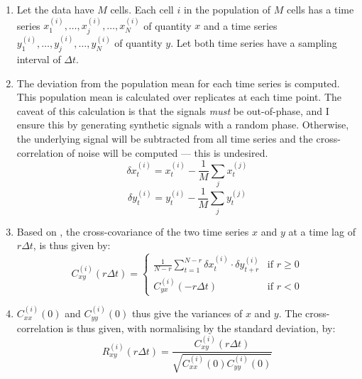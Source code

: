 \begin{enumerate}
  \item Let the data have $M$ cells.
        Each cell $i$ in the population of $M$ cells has a time series $x_{1}^{(i)}, \ldots , x_{j}^{(i)}, \ldots , x_{N}^{(i)}$ of quantity $x$ and a time series $y_{1}^{(i)}, \ldots , y_{j}^{(i)}, \ldots , y_{N}^{(i)}$ of quantity $y$.
        Let both time series have a sampling interval of $\Delta t$.
  \item The deviation from the population mean for each time series is computed.
        This population mean is calculated over replicates at each time point.
        The caveat of this calculation is that the signals \emph{must} be out-of-phase, and I ensure this by generating synthetic signals with a random phase.
        Otherwise, the underlying signal will be subtracted from all time series and the cross-correlation of noise will be computed --- this is undesired.
        \begin{equation}
          \delta x_{t}^{(i)} = x_{t}^{(i)} - \frac{1}{M} \sum_{j}x_{t}^{(j)}
          \label{eq:xcf-dmeans-x}
        \end{equation}
        \begin{equation}
          \delta y_{t}^{(i)} = y_{t}^{(i)} - \frac{1}{M} \sum_{j}y_{t}^{(j)}
          \label{eq:xcf-dmeans-y}
        \end{equation}
  \item Based on \textcite{kivietStochasticityMetabolismGrowth2014}, the cross-covariance of the two time series $x$ and $y$ at a time lag of $r\Delta t$, is thus given by:
        \begin{equation}
          C_{xy}^{(i)}(r\Delta t) =
          \begin{cases}
            \frac{1}{N-r} \sum_{t=1}^{N-r} \delta x_{t}^{(i)} \cdot \delta y_{t+r}^{(i)} & \text{if } r \geq 0 \\
            C_{yx}^{(i)}(-r \Delta t) & \text{if } r < 0
          \end{cases}
          \label{eq:xcf-xcov}
        \end{equation}
    \item $C_{xx}^{(i)}(0)$ and $C_{yy}^{(i)}(0)$ thus give the variances of $x$ and $y$.  The cross-correlation is thus given, with normalising by the standard deviation, by:
        \begin{equation}
          R_{xy}^{(i)}(r \Delta t) = \frac{C_{xy}^{(i)}(r \Delta t)}{\sqrt{C_{xx}^{(i)}(0) C_{yy}^{(i)}(0)}}
          \label{eq:xcf-xcf}
        \end{equation}
\end{enumerate}

